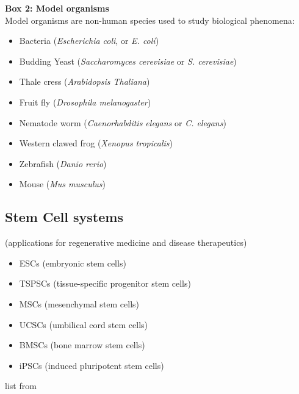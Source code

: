 
\begin{Comment}
\hspace{-2.5mm}\textbf{Box 2: Model organisms}\label{box2}\\

Model organisms are non-human species used to study biological phenomena:

\begin{itemize}
    \item Bacteria (\textit{Escherichia coli}, or \textit{E. coli})
    \item Budding Yeast (\textit{Saccharomyces cerevisiae} or \textit{S. cerevisiae})
    \item Thale cress (\textit{Arabidopsis Thaliana})
    \item Fruit fly (\textit{Drosophila melanogaster})
    \item Nematode worm (\textit{Caenorhabditis elegans} or \textit{C. elegans})
    \item Western clawed frog (\textit{Xenopus tropicalis})
    \item Zebrafish (\textit{Danio rerio})
    \item Mouse (\textit{Mus musculus})

\end{itemize}


\end{Comment}


\subsection{Stem Cell systems}

(applications for regenerative medicine and disease therapeutics)

\begin{itemize}
    \item ESCs (embryonic stem cells)
    \item TSPSCs (tissue-specific progenitor stem cells)
    \item MSCs (mesenchymal stem cells)
    \item UCSCs (umbilical cord stem cells)
    \item BMSCs (bone marrow stem cells)
    \item iPSCs (induced pluripotent stem cells)
\end{itemize}

list from \cite{mahla2016stem}


